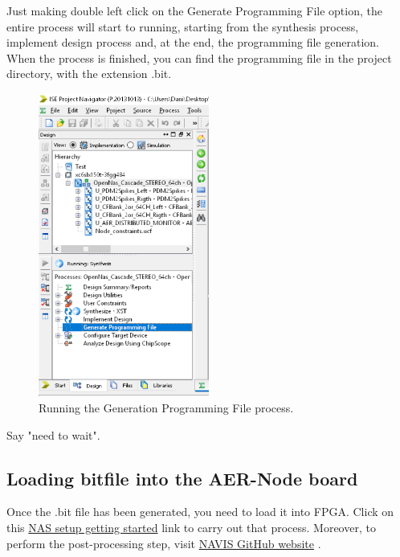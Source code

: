 Just making double left click on the Generate Programming File option, the entire process will start to running, starting from the synthesis process, implement design process and, at the end, the programming file generation. When the process is finished, you can find the programming file in the project directory, with the extension .bit.

\begin{figure}[H]
\centering
\includegraphics[width=0.5\textwidth]{images/Img41_Running.PNG}
\caption{\label{fig:running_generating_prog_file}Running the Generation Programming File process.}
\end{figure}

Say "need to wait".


\subsection{Loading bitfile into the AER-Node board}

Once the .bit file has been generated, you need to load it into FPGA. Click on this \textcolor{blue}{ \href{https://github.com/RTC-research-group/AERtools/tree/master/AERNode/NAS/NAS_user_manual}{NAS setup getting started}} link to carry out that process. Moreover, to perform the post-processing step, visit \textcolor{blue}{ \href{https://github.com/jpdominguez/NAVIS-Tool}{NAVIS GitHub website}} \cite{dominguez2017navis}.


